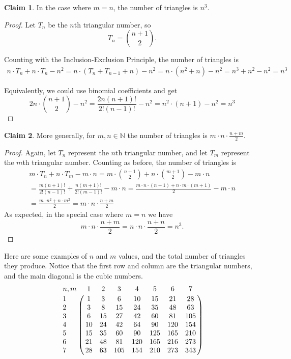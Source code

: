 \documentclass[12pt]{article}
\newcommand{\NN}{\mathbb{N}}
\theoremstyle{definition}
\newtheorem*{claim}{Claim}
\begin{document}
\begin{claim} In the case where $m = n$, the number of triangles is $n^3$.
	\begin{proof} 
	Let $T_n$ be the $n$th triangular number, so
	$$T_n = \binom{n + 1}{2}.$$
		
	Counting with the Inclusion-Exclusion Principle, the number of triangles is
	\begin{multline*} n \cdot T_n + n \cdot T_n - n^2 = n \cdot (T_n + T_{n-1} + n) - n^2 
	= n \cdot (n^2 + n) - n^2 = n^3 + n^2 - n^2 = n^3 \end{multline*}
	
	Equivalently, we could use binomial coefficients and get
	$$ 2n \cdot \binom{n + 1}{2} - n^2 = \frac{2 n (n + 1)!}{2! (n - 1)!} - n^2
	= n^2 \cdot (n + 1) - n^2 = n^3 $$
	\end{proof}
\end{claim}

\newpage

\begin{claim} More generally, for $m, n \in \NN$ the number of triangles is $m \cdot n \cdot \frac{n + m}{2}$.
	\begin{proof} Again, let $T_n$ represent the $n$th triangular number, and let $T_m$ represent the $m$th triangular number. Counting as before, the number of triangles is
	\begin{multline*} m \cdot T_n + n \cdot T_m - m \cdot n = m \cdot \binom{n + 1}{2} + n \cdot \binom{m + 1}{2} - m \cdot n \\
	= \frac{m (n + 1)!}{2! (n - 1)!} + \frac{n (m + 1)!}{2! (m - 1)!} - m \cdot n = \frac{m \cdot n \cdot (n+1) + n \cdot m \cdot (m+1)}{2} - m \cdot n \\
	= \frac{m \cdot n^2 + n \cdot m^2}{2} = m \cdot n \cdot \frac{n+m}{2} \end{multline*}
	As expected, in the special case where $m = n$ we have
	$$m \cdot n \cdot \frac{n+m}{2} = n \cdot n \cdot \frac{n+n}{2} = n^3.$$
	\end{proof}
\end{claim}

Here are some examples of $n$ and $m$ values, and the total number of triangles they produce. Notice that the first row and column are the triangular numbers, and the main diagonal is the cubic numbers. \\

$$\bordermatrix{\text{$n, m$}	& 	1	&	2	&	3	&	4	&	5	&	6	&	7 \cr
                		1			&	1	&	3	&	6	&	10	&	15	&	21	&	28 \cr
                		2			& 	3	&	8	&	15	&	24	&	35	&	48	&	63 \cr
			3			&	6	&	15	&	27	&	42	&	60	&	81	&	105 \cr
			4			&	10	&	24	&	42	&	64	&	90	&	120	&	154 \cr
			5			&	15	&	35	&	60	&	90	&	125	&	165	&	210 \cr
			6			&	21	&	48	&	81	&	120	&	165	&	216	&	273 \cr
			7			&	28	&	63	&	105	&	154	&	210	&	273	&	343}$$
\end{document}
